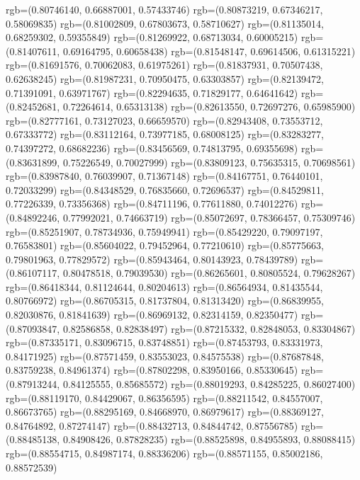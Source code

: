 {{        rgb=(0.80746140, 0.66887001, 0.57433746)
        rgb=(0.80873219, 0.67346217, 0.58069835)
        rgb=(0.81002809, 0.67803673, 0.58710627)
        rgb=(0.81135014, 0.68259302, 0.59355849)
        rgb=(0.81269922, 0.68713034, 0.60005215)
        rgb=(0.81407611, 0.69164795, 0.60658438)
        rgb=(0.81548147, 0.69614506, 0.61315221)
        rgb=(0.81691576, 0.70062083, 0.61975261)
        rgb=(0.81837931, 0.70507438, 0.62638245)
        rgb=(0.81987231, 0.70950475, 0.63303857)
        rgb=(0.82139472, 0.71391091, 0.63971767)
        rgb=(0.82294635, 0.71829177, 0.64641642)
        rgb=(0.82452681, 0.72264614, 0.65313138)
        rgb=(0.82613550, 0.72697276, 0.65985900)
        rgb=(0.82777161, 0.73127023, 0.66659570)
        rgb=(0.82943408, 0.73553712, 0.67333772)
        rgb=(0.83112164, 0.73977185, 0.68008125)
        rgb=(0.83283277, 0.74397272, 0.68682236)
        rgb=(0.83456569, 0.74813795, 0.69355698)
        rgb=(0.83631899, 0.75226549, 0.70027999)
        rgb=(0.83809123, 0.75635315, 0.70698561)
        rgb=(0.83987840, 0.76039907, 0.71367148)
        rgb=(0.84167751, 0.76440101, 0.72033299)
        rgb=(0.84348529, 0.76835660, 0.72696537)
        rgb=(0.84529811, 0.77226339, 0.73356368)
        rgb=(0.84711196, 0.77611880, 0.74012276)
        rgb=(0.84892246, 0.77992021, 0.74663719)
        rgb=(0.85072697, 0.78366457, 0.75309746)
        rgb=(0.85251907, 0.78734936, 0.75949941)
        rgb=(0.85429220, 0.79097197, 0.76583801)
        rgb=(0.85604022, 0.79452964, 0.77210610)
        rgb=(0.85775663, 0.79801963, 0.77829572)
        rgb=(0.85943464, 0.80143923, 0.78439789)
        rgb=(0.86107117, 0.80478518, 0.79039530)
        rgb=(0.86265601, 0.80805524, 0.79628267)
        rgb=(0.86418344, 0.81124644, 0.80204613)
        rgb=(0.86564934, 0.81435544, 0.80766972)
        rgb=(0.86705315, 0.81737804, 0.81313420)
        rgb=(0.86839955, 0.82030876, 0.81841639)
        rgb=(0.86969132, 0.82314159, 0.82350477)
        rgb=(0.87093847, 0.82586858, 0.82838497)
        rgb=(0.87215332, 0.82848053, 0.83304867)
        rgb=(0.87335171, 0.83096715, 0.83748851)
        rgb=(0.87453793, 0.83331973, 0.84171925)
        rgb=(0.87571459, 0.83553023, 0.84575538)
        rgb=(0.87687848, 0.83759238, 0.84961374)
        rgb=(0.87802298, 0.83950166, 0.85330645)
        rgb=(0.87913244, 0.84125555, 0.85685572)
        rgb=(0.88019293, 0.84285225, 0.86027400)
        rgb=(0.88119170, 0.84429067, 0.86356595)
        rgb=(0.88211542, 0.84557007, 0.86673765)
        rgb=(0.88295169, 0.84668970, 0.86979617)
        rgb=(0.88369127, 0.84764892, 0.87274147)
        rgb=(0.88432713, 0.84844742, 0.87556785)
        rgb=(0.88485138, 0.84908426, 0.87828235)
        rgb=(0.88525898, 0.84955893, 0.88088415)
        rgb=(0.88554715, 0.84987174, 0.88336206)
        rgb=(0.88571155, 0.85002186, 0.88572539)
    }
}